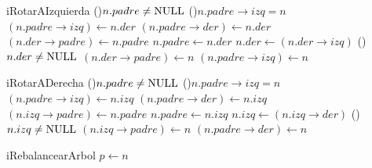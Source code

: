 \begin{Algoritmos}
  \begin{algoritmo}{iRotarAIzquierda}{}{}
    \If(){$n.padre \neq \textrm{NULL}$}{
      \eIf(){$n.padre \to izq = n$}{
        $(n.padre \to izq) \gets n.der$ 
      }{
        $(n.padre \to der) \gets n.der$ 
      }
    }
    $(n.der \to padre) \gets n.padre$  
    $n.padre \gets n.der$ 
    $n.der \gets (n.der \to izq)$ 
    \If(){$n.der \neq \textrm{NULL}$}{
      $(n.der \to padre) \gets n$ 
    }
    $(n.padre \to izq) \gets n$ 
  \end{algoritmo}

  \begin{algoritmo}{iRotarADerecha}{}{}
    \If(){$n.padre \neq \textrm{NULL}$}{
      \eIf(){$n.padre \to izq = n$}{
        $(n.padre \to izq) \gets n.izq$ 
      }{
        $(n.padre \to der) \gets n.izq$ 
      }
    }
    $(n.izq \to padre) \gets n.padre$  
    $n.padre \gets n.izq$ 
    $n.izq \gets (n.izq \to der)$ 
    \If(){$n.izq \neq \textrm{NULL}$}{
      $(n.izq \to padre) \gets n$ 
    }
    $(n.padre \to der) \gets n$ 
  \end{algoritmo}

  \begin{algoritmo}{iRebalancearArbol}{}{}
     $p \gets n$ 
  \end{algoritmo}
  \complejidad{}

\end{Algoritmos}